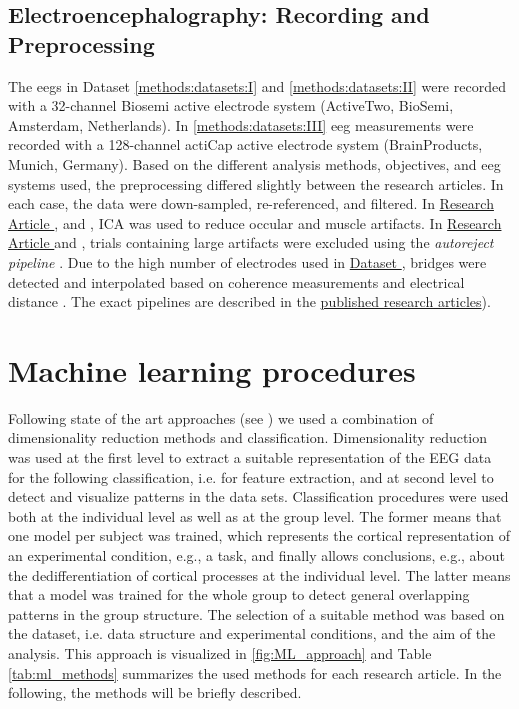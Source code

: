 \subsection{Electroencephalography: Recording and Preprocessing}
The \glspl{eeg} in Dataset \autoref{methods:datasets:I} and \autoref{methods:datasets:II} were recorded with a 32-channel Biosemi active electrode system (ActiveTwo, BioSemi, Amsterdam, Netherlands). In \autoref{methods:datasets:III} \gls{eeg} measurements were recorded with a 128-channel actiCap active electrode system (BrainProducts, Munich, Germany).
Based on the different analysis methods, objectives, and \gls{eeg} systems used, the preprocessing differed slightly between the research articles. In each case, the data were down-sampled, re-referenced, and filtered. In \hyperref[res:paperI]{Research Article }, \hyperref[res:paperIII]{} and \hyperref[res:paperIV]{}, ICA was used to reduce occular and muscle artifacts. In \hyperref[res:paperI]{Research Article } and \hyperref[res:paperIII]{}, trials containing large artifacts were excluded using the \textit{autoreject pipeline} \cite{Jas2017}. Due to the high number of electrodes used in \hyperref[methods:datasets:III]{Dataset }, bridges were detected and interpolated based on coherence measurements and electrical distance \cite{Alschuler2014}. The exact pipelines are described in the \hyperref[pub:papers]{published research articles}).  

\section{Machine learning procedures} 
Following state of the art approaches (see ) we used a combination of dimensionality reduction methods and classification. Dimensionality reduction was used at the first level to extract a suitable representation of the EEG data for the following classification, i.e. for feature extraction, and at second level to detect and visualize patterns in the data sets. Classification procedures were used both at the individual level as well as at the group level. The former means that one model per subject was trained, which represents the cortical representation of an experimental condition, e.g., a task, and finally allows conclusions, e.g., about the dedifferentiation of cortical processes at the individual level. The latter means that a model was trained for the whole group to detect general overlapping patterns in the group structure. The selection of a suitable method was based on the dataset, i.e. data structure and experimental conditions, and the aim of the analysis. This approach is visualized in \autoref{fig:ML_approach} and Table \autoref{tab:ml_methods}  summarizes the used methods for each research article. In the following, the methods will be briefly described.

